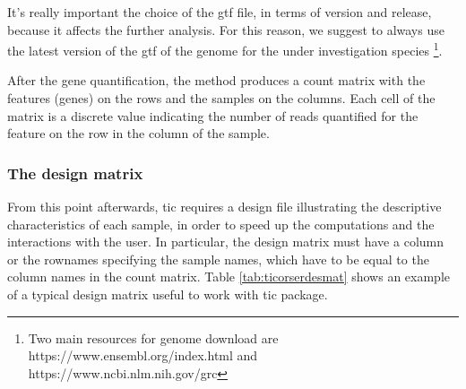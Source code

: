 It's really important the choice of the \gls{gtf} file, in terms of version and release, because it affects the further analysis. For this reason, we suggest to always use the latest version of the \gls{gtf} of the genome for the under investigation species \footnote{Two main resources for genome download are https://www.ensembl.org/index.html and https://www.ncbi.nlm.nih.gov/grc}. 

After the gene quantification, the method produces a count matrix with the features (genes) on the rows and the samples on the columns. 
Each cell of the matrix is a discrete value indicating the number of reads quantified for the feature on the row in the column of the sample. 

\subsubsection{The design matrix}
From this point afterwards, \gls{tic} requires a design file illustrating the descriptive characteristics of each sample, in order to speed up the computations and the interactions with the user.
In particular, the design matrix must have a column or the rownames specifying the sample names, which have to be equal to the column names in the count matrix.
Table \ref{tab:ticorserdesmat} shows an example of a typical design matrix useful to work with \gls{tic} package.

